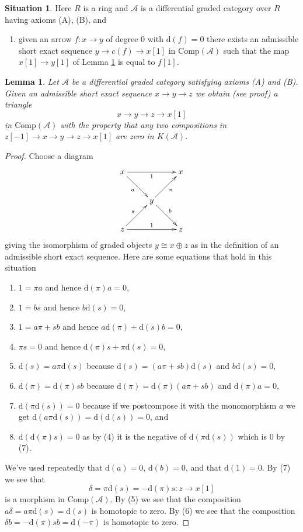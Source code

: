 \documentclass{stacks-project}
\theoremstyle{plain}
\newtheorem{lemma}[subsection]{Lemma}
\theoremstyle{definition}
\newtheorem{situation}[subsection]{Situation}
\theoremstyle{remark}
\numberwithin{equation}{subsection}
\begin{document}
\begin{situation}
\label{situation-ABC}
Here $R$ is a ring and $\mathcal{A}$ is a differential graded category
over $R$ having axioms (A), (B), and
\begin{enumerate}
\item[(C)] given an arrow $f : x \to y$ of degree $0$ with
$\text{d}(f) = 0$ there exists an admissible short exact sequence
$y \to c(f) \to x[1]$ in $\text{Comp}(\mathcal{A})$ such that the map
$x[1] \to y[1]$ of Lemma \ref{lemma-get-triangle} is equal to $f[1]$.
\end{enumerate}
\end{situation}

\begin{lemma}
\label{lemma-get-triangle}
Let $\mathcal{A}$ be a differential graded category satisfying
axioms (A) and (B). Given an admissible short exact sequence
$x \to y \to z$ we obtain (see proof) a triangle
$$
x \to y \to z \to x[1]
$$
in $\text{Comp}(\mathcal{A})$ with the property that any two compositions
in $z[-1] \to x \to y \to z \to x[1]$ are zero in $K(\mathcal{A})$.
\end{lemma}

\begin{proof}
Choose a diagram
$$
\xymatrix{
x \ar[rr]_1 \ar[rd]_a & & x \\
& y \ar[ru]_\pi \ar[rd]^b & \\
z \ar[rr]^1 \ar[ru]^s & & z
}
$$
giving the isomorphism of graded objects $y \cong x \oplus z$ as in the
definition of an admissible short exact sequence. Here are some equations
that hold in this situation
\begin{enumerate}
\item $1 = \pi a$ and hence $\text{d}(\pi) a = 0$,
\item $1 = b s$ and hence $b \text{d}(s) = 0$,
\item $1 = a \pi + s b$ and hence $a \text{d}(\pi) + \text{d}(s) b = 0$,
\item $\pi s = 0$ and hence $\text{d}(\pi)s + \pi \text{d}(s) = 0$,
\item $\text{d}(s) = a \pi \text{d}(s)$ because
$\text{d}(s) = (a \pi + s b)\text{d}(s)$ and $b\text{d}(s) = 0$,
\item $\text{d}(\pi) = \text{d}(\pi) s b$ because
$\text{d}(\pi) = \text{d}(\pi)(a \pi + s b)$ and $\text{d}(\pi)a = 0$,
\item $\text{d}(\pi \text{d}(s)) = 0$ because if we postcompose it
with the monomorphism $a$ we get
$\text{d}(a\pi \text{d}(s)) = \text{d}(\text{d}(s)) = 0$, and
\item $\text{d}(\text{d}(\pi)s) = 0$ as by (4) it is the negative
of $\text{d}(\pi\text{d}(s))$ which is $0$ by (7).
\end{enumerate}
We've used repeatedly that $\text{d}(a) = 0$, $\text{d}(b) = 0$,
and that $\text{d}(1) = 0$. By (7) we see that
$$
\delta = \pi \text{d}(s) = - \text{d}(\pi) s : z \to x[1]
$$
is a morphism in $\text{Comp}(\mathcal{A})$. By (5) we see that
the composition $a \delta = a \pi \text{d}(s) = \text{d}(s)$
is homotopic to zero. By (6) we see that the composition
$\delta b = - \text{d}(\pi)sb = \text{d}(-\pi)$ is homotopic to zero.
\end{proof}
\end{document}

